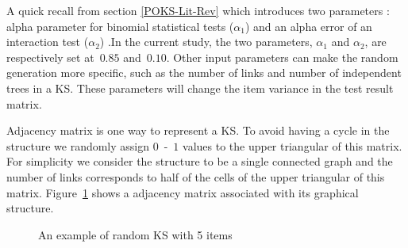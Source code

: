 A quick recall from section \ref{POKS-Lit-Rev} which introduces two parameters : alpha parameter for binomial statistical tests ($\alpha_1$) and an alpha error of an interaction test ($\alpha_2$) .In the current study, the two parameters, $\alpha_1$ and $\alpha_2$, are respectively set at~$0.85$ and~$0.10$. 
Other input parameters can make the random generation more specific, such as the number of links and number of independent trees in a KS. These parameters will change the item variance in the test result matrix. 

Adjacency matrix is one way to represent a KS. To avoid having a cycle in the structure we randomly assign $0$~-~$1$ values to the upper triangular of this matrix. For simplicity we consider the structure to be a single connected graph and the number of links corresponds to half of the cells of the upper triangular of this matrix. Figure~\ref{fig:KSExample} shows a adjacency matrix associated with its graphical structure. 


\begin{figure}[h]
\centering 
{}
\qquad
\qquad
{}

\caption{An example of random KS with 5 items}
\label{fig:KSExample}
\end{figure}


